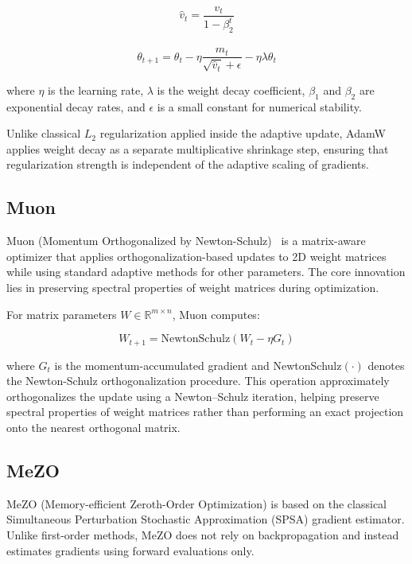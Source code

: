 \documentclass{article}
\begin{document}
\begin{equation}
\hat{v}_t = \frac{v_t}{1 - \beta_2^t}
\end{equation}

\begin{equation}
\theta_{t+1} = \theta_t 
- \eta \frac{\hat{m}_t}{\sqrt{\hat{v}_t} + \epsilon}
- \eta \lambda \theta_t
\end{equation}

where $\eta$ is the learning rate, $\lambda$ is the weight decay coefficient, 
$\beta_1$ and $\beta_2$ are exponential decay rates, and $\epsilon$ is a small constant 
for numerical stability.

Unlike classical $L_2$ regularization applied inside the adaptive update, 
AdamW applies weight decay as a separate multiplicative shrinkage step, 
ensuring that regularization strength is independent of the adaptive scaling 
of gradients.

\subsection{Muon}

Muon (Momentum Orthogonalized by Newton-Schulz)~\cite{moonshot2025moonlight} is a matrix-aware optimizer that applies orthogonalization-based updates to 2D weight matrices while using standard adaptive methods for other parameters. The core innovation lies in preserving spectral properties of weight matrices during optimization.

For matrix parameters $W \in \mathbb{R}^{m \times n}$, Muon computes:

\begin{equation}
W_{t+1} = \text{NewtonSchulz}(W_t - \eta G_t)
\end{equation}

where $G_t$ is the momentum-accumulated gradient and NewtonSchulz$(\cdot)$ denotes the Newton-Schulz orthogonalization procedure. This operation approximately orthogonalizes the update using a Newton–Schulz iteration, helping preserve spectral properties of weight matrices rather than performing an exact projection onto the nearest orthogonal matrix.

\subsection{MeZO}

MeZO (Memory-efficient Zeroth-Order Optimization) \cite{malladi2023mezo}
is based on the classical Simultaneous Perturbation Stochastic Approximation (SPSA) gradient estimator. Unlike first-order methods, MeZO does not rely on backpropagation and instead estimates gradients using forward evaluations only.
\end{document}
